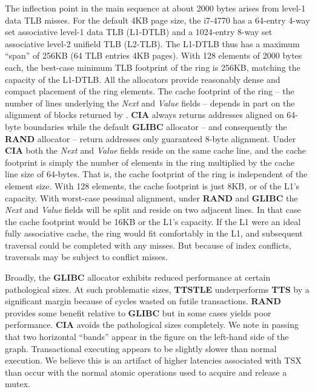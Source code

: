 \documentclass[preprint]{sigplanconf}
\begin{document}
The inflection point in the main sequence at about 2000 bytes arises from level-1 data
TLB misses.  For the default 4KB page size, the i7-4770 has a 64-entry 4-way set associative
level-1 data TLB (L1-DTLB) and a 1024-entry 8-way set associative level-2 
unifield TLB (L2-TLB).  
The L1-DTLB thus has a maximum ``span'' of 256KB (64 TLB entries  4KB pages).  
With 128 elements of 2000 bytes each, the best-case minimum TLB footprint of 
the ring is 256KB, matching the capacity of the L1-DTLB.  
All the allocators provide reasonably dense and compact placement of the ring elements.  
The cache footprint of the ring -- the number of lines underlying the \emph{Next}
and \emph{Value} fields -- depends in part on the alignment of blocks returned
by \malloc{}.  \textbf{CIA} always returns addresses aligned on 64-byte boundaries
while the default \textbf{GLIBC} allocator -- and consequently the \textbf{RAND} 
allocator -- return addresses only guaranteed 8-byte alignment.  Under \textbf{CIA}
both the \emph{Next} and \emph{Value} fields reside on the same cache 
line, and the cache footprint is simply the number of elements in the ring multiplied
by the cache line size of 64-bytes.  That is, the cache footprint of  
the ring is independent of the element size.  With 128 elements, the cache 
footprint is just 8KB, or  of
the L1's capacity.  With worst-case pessimal alignment, under \textbf{RAND} and
\textbf{GLIBC} the \emph{Next} and \emph{Value} fields will be split and reside
on two adjacent lines.   In that case the cache footprint would be 16KB or 
the L1's capacity.  If the L1 were an ideal fully associative cache, the ring would
fit comfortably in the L1, and subsequent traversal could be completed with any misses.
But because of index conflicts, traversals may be subject to conflict misses. 

Broadly, the \textbf{GLIBC} allocator exhibits reduced performance at 
certain pathological sizes.   At such problematic sizes, \textbf{TTSTLE} underperforms
\textbf{TTS} by a significant margin because of cycles wasted on futile
transactions.  \textbf{RAND} provides some benefit relative to \textbf{GLIBC}
but in some cases yields poor performance.  \textbf{CIA} avoids the pathological
sizes completely.   We note in passing that two horizontal ``bands'' appear 
in the figure on the left-hand side of the graph.  Transactional executing appears
to be slightly slower than normal execution.   We believe this is an artifact
of higher latencies associated with TSX than occur with the normal atomic
operations used to acquire and release a mutex. 
\end{document}
